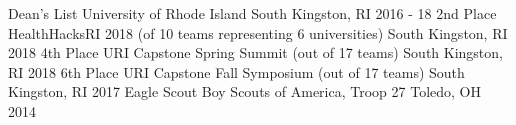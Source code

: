  \begin{cvhonors}
  \cvhonor
    {Dean's List}
    {University of Rhode Island}
    {South Kingston, RI}
    {2016 - 18}
  \cvhonor
    {2nd Place}
    {HealthHacksRI 2018 (of 10 teams representing 6 universities)}
    {South Kingston, RI}
    {2018}
  \cvhonor
    {4th Place}
    {URI Capstone Spring Summit (out of 17 teams)}
    {South Kingston, RI}
    {2018}
  \cvhonor
    {6th Place}
    {URI Capstone Fall Symposium (out of 17 teams)}
    {South Kingston, RI}
    {2017}
  \cvhonor
    {Eagle Scout}
    {Boy Scouts of America, Troop 27}
    {Toledo, OH}
    {2014}
\end{cvhonors}
